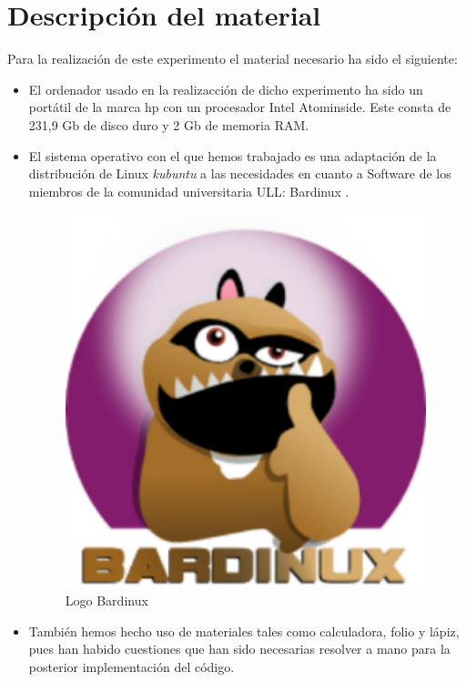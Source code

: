 \section{Descripción del material}
\label{3:sec:2}
    Para la realización de este experimento el material necesario ha sido el siguiente:
 \begin{itemize}
  \item El ordenador usado en la realizacción de dicho experimento ha sido un portátil de la marca hp con un procesador Intel Atom{\tiny inside}. Este consta de 231,9 Gb de disco duro y 2 Gb de memoria RAM.
  \item El sistema operativo con el que hemos trabajado es una adaptación de la distribución de Linux \textit{kubuntu} a las necesidades en cuanto a Software de los miembros de la comunidad universitaria ULL: Bardinux \cite{url:bardinux}. 
 
  \begin{figure}[!h]
  \begin{center}
  \includegraphics[scale=0.15]{images/bardinux.eps}
  \end{center}
  \caption{Logo Bardinux}
  \label{graph:1}
  \end{figure}
  \item También hemos hecho uso de materiales tales como calculadora, folio y lápiz, pues han habido cuestiones que han sido necesarias resolver a mano para la posterior implementación del código.
 \end{itemize}
 
